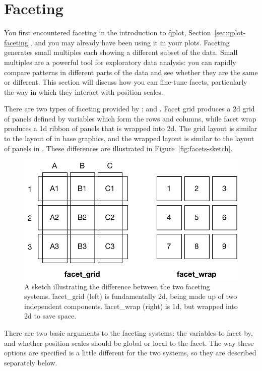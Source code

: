 \section{Faceting}
\label{sec:faceting}

You first encountered faceting in the introduction to \f{qplot}, Section~\ref{sec:qplot-faceting}, and you may already have been using it in your plots.  Faceting generates small multiples each showing a different subset of the data.  Small multiples are a powerful tool for exploratory data analysis: you can rapidly compare patterns in different parts of the data and see whether they are the same or different.  This section will discuss how you can fine-tune facets, particularly the way in which they interact with position scales. 

There are two types of faceting provided by \ggplot:  and .  Facet grid produces a 2d grid of panels defined by variables which form the rows and columns, while facet wrap produces a 1d ribbon of panels that is wrapped into 2d.  The grid layout is similar to the layout of  in base graphics, and the wrapped layout is similar to the layout of panels in .  These differences are illustrated in Figure~\ref{fig:facets-sketch}.

\begin{figure}[htbp]
  \centering
    \includegraphics[width=0.5\linewidth]{position-facets}
  \caption{A sketch illustrating the difference between the two faceting systems.   \f{facet_grid} (left) is fundamentally 2d, being made up of two independent components.  \f{facet_wrap} (right) is 1d, but wrapped into 2d to save space.}
  \label{fig:facet-sketch}
\end{figure}

There are two basic arguments to the faceting systems: the variables to facet by, and whether position scales should be global or local to the facet.  The way these options are specified is a little different for the two systems, so they are described separately below.


